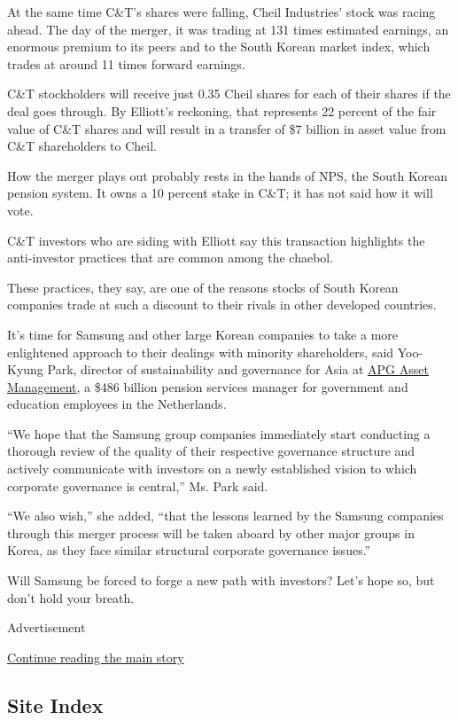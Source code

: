 At the same time C\&T's shares were falling, Cheil Industries' stock was
racing ahead. The day of the merger, it was trading at 131 times
estimated earnings, an enormous premium to its peers and to the South
Korean market index, which trades at around 11 times forward earnings.

C\&T stockholders will receive just 0.35 Cheil shares for each of their
shares if the deal goes through. By Elliott's reckoning, that represents
22 percent of the fair value of C\&T shares and will result in a
transfer of \$7 billion in asset value from C\&T shareholders to Cheil.

How the merger plays out probably rests in the hands of NPS, the South
Korean pension system. It owns a 10 percent stake in C\&T; it has not
said how it will vote.

C\&T investors who are siding with Elliott say this transaction
highlights the anti-investor practices that are common among the
chaebol.

These practices, they say, are one of the reasons stocks of South Korean
companies trade at such a discount to their rivals in other developed
countries.

It's time for Samsung and other large Korean companies to take a more
enlightened approach to their dealings with minority shareholders, said
Yoo-Kyung Park, director of sustainability and governance for Asia at
\href{http://www.apg.nl/en}{APG Asset Management}, a \$486 billion
pension services manager for government and education employees in the
Netherlands.

``We hope that the Samsung group companies immediately start conducting
a thorough review of the quality of their respective governance
structure and actively communicate with investors on a newly established
vision to which corporate governance is central,'' Ms. Park said.

``We also wish,'' she added, ``that the lessons learned by the Samsung
companies through this merger process will be taken aboard by other
major groups in Korea, as they face similar structural corporate
governance issues.''

Will Samsung be forced to forge a new path with investors? Let's hope
so, but don't hold your breath.

Advertisement

\protect\hyperlink{after-bottom}{Continue reading the main story}

\hypertarget{site-index}{%
\subsection{Site Index}\label{site-index}}

